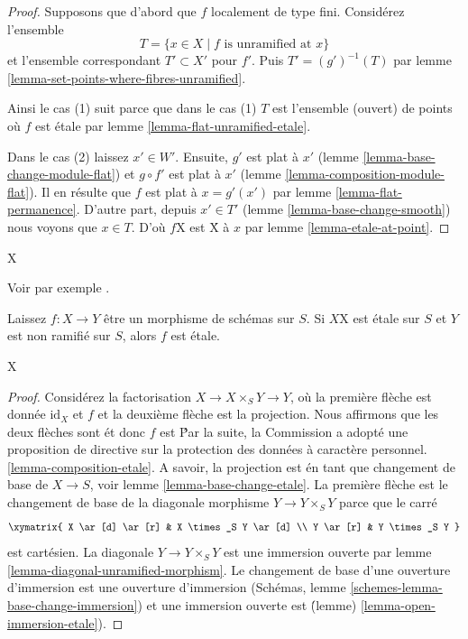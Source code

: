 \begin{proof}
Supposons que d'abord que $f$ localement de type fini. Considérez l'ensemble $$
T = \{x \in X \mid f\text{ is unramified at }x\}
$$ et l'ensemble correspondant $T' \subset X'$ pour $f'$. Puis $T' = (g')^{-1}(T)$ par lemme \ref{lemma-set-points-where-fibres-unramified}.

\medskip\noindent
Ainsi le cas (1) suit parce que dans le cas (1) $T$ est l'ensemble (ouvert) de points où $f$ est \'etale par lemme \ref{lemma-flat-unramified-etale}.

\medskip\noindent
Dans le cas (2) laissez $x' \in W'$. Ensuite, $g'$ est plat à $x'$ (lemme \ref{lemma-base-change-module-flat}) et $g \circ f'$ est plat à $x'$ (lemme \ref{lemma-composition-module-flat}). Il en résulte que $f$ est plat à $x = g'(x')$ par lemme \ref{lemma-flat-permanence}. D'autre part, depuis $x' \in T'$ (lemme \ref{lemma-base-change-smooth}) nous voyons que $x \in T$. D'où $f$X est \'X à $x$ par lemme \ref{lemma-etale-at-point}.
\end{proof}
X

\begin{lemma}

\label{lemma-etale-permanence-better}

\begin{reference}
Voir par exemple \cite[remarque 18.30 (2).]{GWII}.
\end{reference}
Laissez $f : X \to Y$ être un morphisme de schémas sur $S$. Si $X$X est \'etale sur $S$ et $Y$ est non ramifié sur $S$, alors $f$ est \'etale.
\end{lemma}
X

\begin{proof}

Considérez la factorisation $X \to X \times_S Y \to Y$, où la première flèche est donnée $\text{id}_X$ et $f$ et la deuxième flèche est la projection. Nous affirmons que les deux flèches sont \'et donc $f$ est \'Par la suite, la Commission a adopté une proposition de directive sur la protection des données à caractère personnel. \ref{lemma-composition-etale}. A savoir, la projection est \'en tant que changement de base de $X \to S$, voir lemme \ref{lemma-base-change-etale}. La première flèche est le changement de base de la diagonale morphisme
$Y \to Y \times_S Y$ parce que le carré
$$
\xymatrix{
X \ar[d] \ar[r] & X \times_S Y \ar[d] \\
Y \ar[r] & Y \times_S Y
}
$$
est cartésien. La diagonale $Y \to Y \times_S Y$ est une immersion ouverte par lemme \ref{lemma-diagonal-unramified-morphism}. Le changement de base d'une ouverture d'immersion est une ouverture d'immersion (Schémas, lemme \ref{schemes-lemma-base-change-immersion}) et une immersion ouverte est \'(lemme) \ref{lemma-open-immersion-etale}).

\end{proof}

